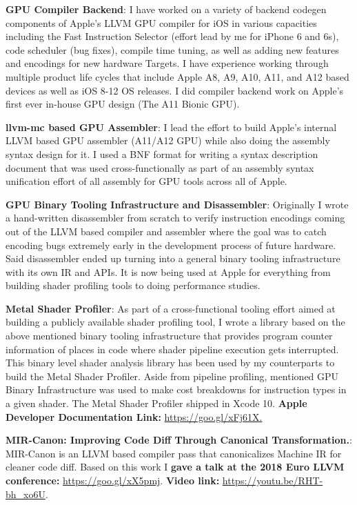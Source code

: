 \documentclass[letterpaper,11pt]{article}
\newcommand{\resumeItem}[2]{
  \item\small{
    \textbf{#1}{: #2 \vspace{-2pt}}
  }
}
\begin{document}
        \resumeItem{GPU Compiler Backend}
          {I have worked on a variety of backend codegen components of Apple's LLVM GPU compiler for iOS in various capacities including the Fast Instruction Selector (effort lead by me for iPhone 6 and 6s), code scheduler (bug fixes), compile time tuning, as well as adding new features and encodings for new hardware Targets. I have experience working through multiple product life cycles that include Apple A8, A9, A10, A11, and A12 based devices as well as iOS 8-12 OS releases. I did compiler backend work on Apple's first ever in-house GPU design (The A11 Bionic GPU). }

         \resumeItem{llvm-mc based GPU Assembler}
          {I lead the effort to build Apple's internal LLVM based GPU assembler (A11/A12 GPU) while also doing the assembly syntax design for it. I used a BNF format for writing a syntax description document that was used cross-functionally as part of an assembly syntax unification effort of all assembly for GPU tools across all of Apple.}

         \resumeItem{GPU Binary Tooling Infrastructure and Disassembler}
          {Originally I wrote a hand-written disassembler from scratch to verify instruction encodings coming out of the LLVM based compiler and assembler where the goal was to catch encoding bugs extremely early in the development process of future hardware. Said disassembler ended up turning into a general binary tooling infrastructure with its own IR and APIs. It is now being used at Apple for everything from building shader profiling tools to doing performance studies.}
    
         \resumeItem{Metal Shader Profiler}
          {As part of a cross-functional tooling effort aimed at building a publicly available shader profiling tool, I wrote a library based on the above mentioned binary tooling infrastructure that provides program counter information of places in code where shader pipeline execution gets interrupted. This binary level shader analysis library has been used by my counterparts to build the Metal Shader Profiler. Aside from pipeline profiling, mentioned GPU Binary Infrastructure was used to make cost breakdowns for instruction types in a given shader. The Metal Shader Profiler shipped in Xcode 10. \textbf{Apple Developer Documentation Link:} \href{https://developer.apple.com/documentation/metal/gpu_functions_libraries/optimizing_performance_with_the_shader_profiler}{https://goo.gl/xFj61X.}}
     
         \resumeItem{MIR-Canon: Improving Code Diff Through Canonical Transformation.}
          {MIR-Canon is an LLVM based compiler pass that canonicalizes Machine IR for cleaner code diff. Based on this work I \textbf{gave a talk at the 2018  Euro LLVM conference:} \href{https://llvm.org/devmtg/2018-04/index.html\#talks}{https://goo.gl/xX5pmj}. \textbf{Video link:}
          \href{https://youtu.be/RHT-bh\_xo6U}{https://youtu.be/RHT-bh\_xo6U}.}
    
\end{document}
